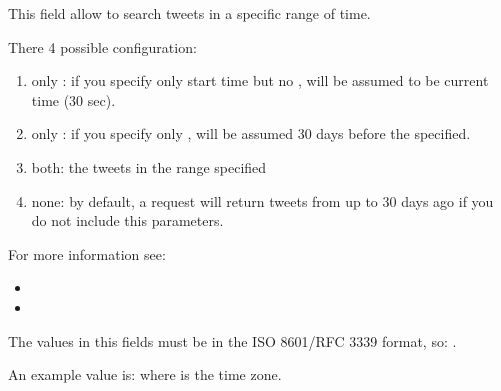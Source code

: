 \documentclass[letterpaper,10pt,english]{sphinxmanual}
\begin{document}
\begin{DUlineblock}{0em}
\item[] This field allow to search tweets in a specific range of time.
\item[] There 4 possible configuration:
\end{DUlineblock}
\begin{enumerate}
%
\item {} 
\sphinxAtStartPar
only : if you specify only start time but no ,  will be assumed to be current time (\sphinxhyphen{}30 sec).

\item {} 
\sphinxAtStartPar
only : if you specify only ,  will be assumed 30 days before the  specified.

\item {} 
\sphinxAtStartPar
both: the tweets in the range specified

\item {} 
\sphinxAtStartPar
none: by default, a request will return tweets from up to 30 days ago if you do not include this parameters.

\end{enumerate}

\begin{DUlineblock}{0em}
\item[] For more information see:
\end{DUlineblock}
\begin{itemize}
\item {} 
\sphinxAtStartPar
{}

\item {} 
\sphinxAtStartPar
{}

\end{itemize}

\begin{DUlineblock}{0em}
\item[] The values in this fields must be in the ISO 8601/RFC 3339 format, so: .
\item[] An example value is:  where  is the time zone.
\end{DUlineblock}
\end{document}

